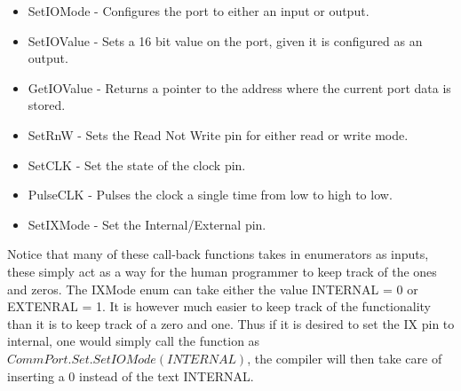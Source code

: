 \begin{itemize}
    \item SetIOMode - Configures the port to either an input or output.
    \item SetIOValue - Sets a 16 bit value on the port, given it is configured as an output.
    \item GetIOValue - Returns a pointer to the address where the current port data is stored.
    \item SetRnW - Sets the Read Not Write pin for either read or write mode.
    \item SetCLK - Set the state of the clock pin.
    \item PulseCLK - Pulses the clock a single time from low to high to low.
    \item SetIXMode - Set the Internal/External pin.
\end{itemize}

Notice that many of these call-back functions takes in enumerators as inputs, these simply act as a way for the human programmer to keep track of the ones and zeros. The IXMode enum can take either the value INTERNAL = 0 or EXTENRAL = 1. It is however much easier to keep track of the functionality than it is to keep track of a zero and one. Thus if it is desired to set the IX pin to internal, one would simply call the function as $CommPort.Set.SetIOMode(INTERNAL)$, the compiler will then take care of inserting a 0 instead of the text INTERNAL.



